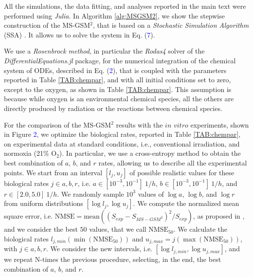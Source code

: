 \documentclass[10pt]{iopart}
\numberwithin{table}{section}
\begin{document}
All the simulations, the data fitting, and analyses reported in the main text were performed using \textit{Julia}. In Algorithm \ref{alg:MSGSM2}, we show the stepwise construction of the MS-GSM$^2$, that is based on a \textit{Stochastic Simulation Algorithm} (SSA) \cite{Wei}. It allows us to solve the system in Eq. (\textcolor{blue}{7}).

We use a \textit{Rosenbrock method}, in particular the \textit{Rodas4} solver of the \textit{DifferentialEquations.jl} package, for the numerical integration of the chemical system of ODEs, described in Eq. (\textcolor{blue}{2}), that is coupled with the parameters reported in Table \ref{TAB:chempar}, and with all initial conditions set to zero, except to the oxygen, as shown in Table \ref{TAB:chempar}. This assumption is because while oxygen is an environmental chemical species, all the others are directly produced by radiation or the reactions between chemical species.

For the comparison of the MS-GSM$^2$ results with the $\textit{in vitro}$ experiments, shown in Figure \textcolor{blue}{2}, we optimize the biological rates, reported in Table \ref{TAB:chempar}, on experimental data at standard conditions, i.e., conventional irradiation, and normoxia (21\% $\mathrm{O_2}$). In particular, we use a cross-entropy method to obtain the best combination of $a$, $b$, and $r$ rates, allowing us to describe all the experimental points. We start from an interval $[l_j, u_j]$ of possible realistic values for these biological rates $j \in {a, b, r}$, i.e. $a \in [10^{-3}, 10^{-1}]~1/h$, $b \in [10^{-3}, 10^{-1}]~1/h$, and $r \in [2.0, 5.0]~1/h$. We randomly sample $10^3$ values of $\log{a}$, $\log{b}$, and $\log{r}$ from uniform distributions $[\log{l_j}, \log{u_j}]$. We compute the normalized mean square error, i.e. $\text{NMSE} = \mathrm{mean} \left( \left( S_{exp} - S_{MS-GSM^2} \right)^2 / S_{exp} \right)$, as proposed in \cite{Missiaggia2024}, and we consider the best $50$ values, that we call $\text{NMSE}_{50}$. We calculate the biological rates $l_{j,min} \left( \min \left( \text{NMSE}_{50} \right) \right)$ and $u_{j,max} = j \left( \max \left( \text{NMSE}_{50} \right) \right)$, with $j \in {a, b, r}$. We consider the new intervals, i.e. $[\log{l_{j,min}}, \log{u_{j,max}}]$, and we repeat N-times the previous procedure, selecting, in the end, the best combination of $a$, $b$, and $r$.
\end{document}

